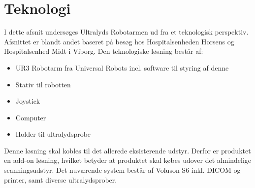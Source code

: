 \chapter{Teknologi}
I dette afsnit undersøges Ultralyds Robotarmen ud fra et teknologisk perspektiv. Afsnittet er blandt andet baseret på besøg hos Hospitalsenheden Horsens og Hospitalsenhed Midt i Viborg. Den teknologiske løsning består af:
\begin{itemize}
\item UR3 Robotarm fra Universal Robots incl. software til styring af denne
\item Stativ til robotten
\item Joystick
\item Computer
\item Holder til ultralydsprobe
\end{itemize}
Denne løsning skal kobles til det allerede eksisterende udstyr. Derfor er produktet en add-on løsning, hvilket betyder at produktet skal købes udover det almindelige scanningsudstyr. Det nuværende system består af Voluson S6 inkl. DICOM og printer, samt diverse ultralydsprober.  

